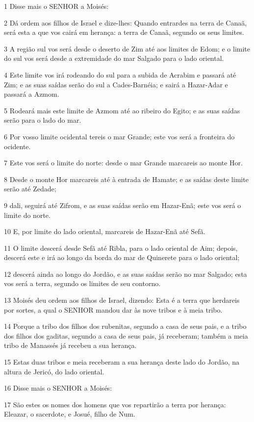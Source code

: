 \par 1 Disse mais o SENHOR a Moisés:
\par 2 Dá ordem aos filhos de Israel e dize-lhes: Quando entrardes na terra de Canaã, será esta a que vos cairá em herança: a terra de Canaã, segundo os seus limites.
\par 3 A região sul vos será desde o deserto de Zim até aos limites de Edom; e o limite do sul vos será desde a extremidade do mar Salgado para o lado oriental.
\par 4 Este limite vos irá rodeando do sul para a subida de Acrabim e passará até Zim; e as suas saídas serão do sul a Cades-Barnéia; e sairá a Hazar-Adar e passará a Azmom.
\par 5 Rodeará mais este limite de Azmom até ao ribeiro do Egito; e as suas saídas serão para o lado do mar.
\par 6 Por vosso limite ocidental tereis o mar Grande; este vos será a fronteira do ocidente.
\par 7 Este vos será o limite do norte: desde o mar Grande marcareis ao monte Hor.
\par 8 Desde o monte Hor marcareis até à entrada de Hamate; e as saídas deste limite serão até Zedade;
\par 9 dali, seguirá até Zifrom, e as suas saídas serão em Hazar-Enã; este vos será o limite do norte.
\par 10 E, por limite do lado oriental, marcareis de Hazar-Enã até Sefã.
\par 11 O limite descerá desde Sefã até Ribla, para o lado oriental de Aim; depois, descerá este e irá ao longo da borda do mar de Quinerete para o lado oriental;
\par 12 descerá ainda ao longo do Jordão, e as suas saídas serão no mar Salgado; esta vos será a terra, segundo os limites de seu contorno.
\par 13 Moisés deu ordem aos filhos de Israel, dizendo: Esta é a terra que herdareis por sortes, a qual o SENHOR mandou dar às nove tribos e à meia tribo.
\par 14 Porque a tribo dos filhos dos rubenitas, segundo a casa de seus pais, e a tribo dos filhos dos gaditas, segundo a casa de seus pais, já receberam; também a meia tribo de Manassés já recebeu a sua herança.
\par 15 Estas duas tribos e meia receberam a sua herança deste lado do Jordão, na altura de Jericó, do lado oriental.
\par 16 Disse mais o SENHOR a Moisés:
\par 17 São estes os nomes dos homens que vos repartirão a terra por herança: Eleazar, o sacerdote, e Josué, filho de Num.
